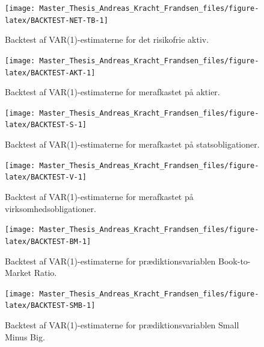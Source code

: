 \documentclass[
  a4paper,
  oneside]{memoir}
\begin{document}
\begin{figure}[H]

{\centering \texttt{[image: Master\_Thesis\_Andreas\_Kracht\_Frandsen\_files/figure-latex/BACKTEST-NET-TB-1]} 

}

\caption[short]{Backtest af VAR(1)-estimaterne for det risikofrie aktiv.}\label{fig:BACKTEST-NET-TB}
\end{figure}

\begin{figure}[H]

{\centering \texttt{[image: Master\_Thesis\_Andreas\_Kracht\_Frandsen\_files/figure-latex/BACKTEST-AKT-1]} 

}

\caption[short]{Backtest af VAR(1)-estimaterne for merafkastet på aktier.}\label{fig:BACKTEST-AKT}
\end{figure}

\begin{figure}[H]

{\centering \texttt{[image: Master\_Thesis\_Andreas\_Kracht\_Frandsen\_files/figure-latex/BACKTEST-S-1]} 

}

\caption[short]{Backtest af VAR(1)-estimaterne for merafkastet på statsobligationer.}\label{fig:BACKTEST-S}
\end{figure}

\begin{figure}[H]

{\centering \texttt{[image: Master\_Thesis\_Andreas\_Kracht\_Frandsen\_files/figure-latex/BACKTEST-V-1]} 

}

\caption[short]{Backtest af VAR(1)-estimaterne for merafkastet på virksomhedsobligationer.}\label{fig:BACKTEST-V}
\end{figure}

\begin{figure}[H]

{\centering \texttt{[image: Master\_Thesis\_Andreas\_Kracht\_Frandsen\_files/figure-latex/BACKTEST-BM-1]} 

}

\caption[short]{Backtest af VAR(1)-estimaterne for prædiktionsvariablen Book-to-Market Ratio.}\label{fig:BACKTEST-BM}
\end{figure}

\begin{figure}[H]

{\centering \texttt{[image: Master\_Thesis\_Andreas\_Kracht\_Frandsen\_files/figure-latex/BACKTEST-SMB-1]} 

}

\caption[short]{Backtest af VAR(1)-estimaterne for prædiktionsvariablen Small Minus Big.}\label{fig:BACKTEST-SMB}
\end{figure}
\end{document}
